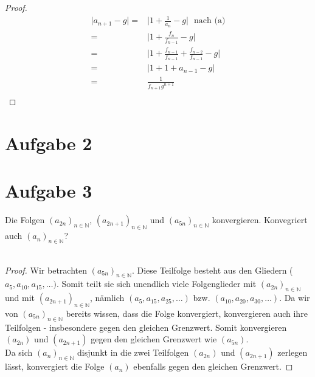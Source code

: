 \documentclass{scrreprt}
\newcommand{\NN}{\mathbb{N}}
\begin{document}
\begin{enumerate}[(a)]
\begin{proof}
\begin{align*}
                    \vert a_{n+1} - g \vert =  & \vert 1 + \frac{1}{a_n} - g \vert ~~~ \text{nach (a)} \\
                    = & \vert 1 + \frac{f_n}{f_{n-1}} - g \vert\\
                    = & \vert 1 + \frac{f_{n-1}}{f_{n-1}} + \frac{f_{n-2}}{f_
                    {n-1}} - g \vert\\
                    = & \vert 1 + 1 + a_{n-1} - g \vert\\
                    = & \frac{1}{f_{n+1} g^{n+1}}\\
                \end{align*}
            \end{proof}
	\end{enumerate}

    \section*{Aufgabe 2}

    \section*{Aufgabe 3}
    Die Folgen $(a_{2n})_{n \in \NN}$, $(a_{2n + 1})_{n \in \NN}$ und $(a_{5n})_{n \in \NN}$ konvergieren. Konvegriert auch $(a_n)_{n \in \NN}$?
    \\\\
    \begin{proof}
    Wir betrachten $(a_{5n})_{n \in \NN}$. Diese Teilfolge besteht aus den Gliedern ($a_5, a_{10}, a_{15}, \dots)$. Somit teilt sie sich unendlich viele Folgenglieder mit $(a_{2n})_{n \in \NN}$ und mit $(a_{2n +1})_{n \in \NN}$, nämlich $(a_{5}, a_{15}, a_{25}, \dots)$ bzw. $(a_{10}, a_{20}, a_{30}, \dots)$. Da wir von $(a_{5n})_{n \in \NN}$ bereits wissen, dass die Folge konvergiert, konvergieren auch ihre Teilfolgen - insbesondere gegen den gleichen Grenzwert.
    Somit konvergieren $(a_{2n})$ und $(a_{2n + 1})$ gegen den gleichen Grenzwert wie $(a_{5n})$.\\
    Da sich $(a_n)_{n \in \NN}$ disjunkt in die zwei Teilfolgen $(a_{2n})$ und $(a_{2n + 1})$ zerlegen lässt, konvergiert die Folge $(a_{n})$ ebenfalls gegen den gleichen Grenzwert.
    \end{proof}
\end{document}
